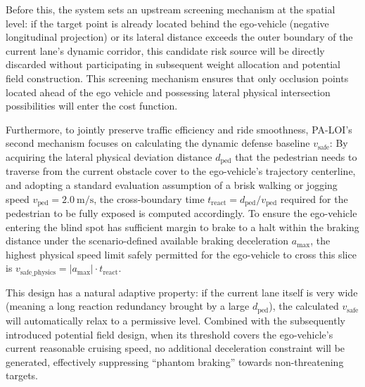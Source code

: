 \documentclass[conference]{IEEEtran}
\begin{document}
Before this, the system sets an upstream screening mechanism at the spatial level: if the target point is already located behind the ego-vehicle (negative longitudinal projection) or its lateral distance exceeds the outer boundary of the current lane's dynamic corridor, this candidate risk source will be directly discarded without participating in subsequent weight allocation and potential field construction. This screening mechanism ensures that only occlusion points located ahead of the ego vehicle and possessing lateral physical intersection possibilities will enter the cost function.

Furthermore, to jointly preserve traffic efficiency and ride smoothness, PA-LOI's second mechanism focuses on calculating the dynamic defense baseline $v_{\text{safe}}$:
By acquiring the lateral physical deviation distance $d_{\text{ped}}$ that the pedestrian needs to traverse from the current obstacle cover to the ego-vehicle's trajectory centerline, and adopting a standard evaluation assumption of a brisk walking or jogging speed $v_{\text{ped}} = \SI{2.0}{\meter\per\second}$, the cross-boundary time $t_{\text{react}} = d_{\text{ped}} / v_{\text{ped}}$ required for the pedestrian to be fully exposed is computed accordingly. To ensure the ego-vehicle entering the blind spot has sufficient margin to brake to a halt within the braking distance under the scenario-defined available braking deceleration $a_{\text{max}}$, the highest physical speed limit safely permitted for the ego-vehicle to cross this slice is $v_{\text{safe\_physics}} = |a_{\text{max}}| \cdot t_{\text{react}}$.

This design has a natural adaptive property: if the current lane itself is very wide (meaning a long reaction redundancy brought by a large $d_{\text{ped}}$), the calculated $v_{\text{safe}}$ will automatically relax to a permissive level. Combined with the subsequently introduced potential field design, when its threshold covers the ego-vehicle's current reasonable cruising speed, no additional deceleration constraint will be generated, effectively suppressing ``phantom braking'' towards non-threatening targets.
\end{document}
